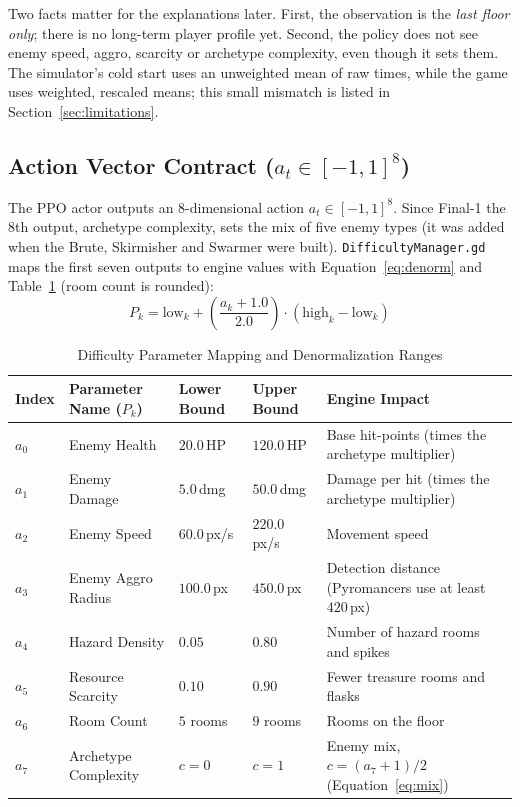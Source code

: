 Two facts matter for the explanations later. First, the observation is the \emph{last floor only}; there is no long-term player profile yet. Second, the policy does not see enemy speed, aggro, scarcity or archetype complexity, even though it sets them. The simulator's cold start uses an unweighted mean of raw times, while the game uses weighted, rescaled means; this small mismatch is listed in Section~\ref{sec:limitations}.

\subsection{Action Vector Contract ($a_t \in [-1, 1]^8$)}
The PPO actor outputs an 8-dimensional action $a_t \in [-1, 1]^8$. Since Final-1 the 8th output, archetype complexity, sets the mix of five enemy types (it was added when the Brute, Skirmisher and Swarmer were built). \texttt{DifficultyManager.gd} maps the first seven outputs to engine values with Equation~\ref{eq:denorm} and Table~\ref{tab:param_ranges} (room count is rounded):
\begin{equation}
P_k = \text{low}_k + \left( \frac{a_k + 1.0}{2.0} \right) \cdot (\text{high}_k - \text{low}_k)
\label{eq:denorm}
\end{equation}

\begin{table}[!htbp]
\centering
\caption{Difficulty Parameter Mapping and Denormalization Ranges}
\label{tab:param_ranges}
\small
\begin{tabular}{p{}p{}p{}p{}p{}}
\toprule
\textbf{Index} & \textbf{Parameter Name ($P_k$)} & \textbf{Lower Bound} & \textbf{Upper Bound} & \textbf{Engine Impact} \\
\midrule
$a_0$ & Enemy Health & $20.0$\,HP & $120.0$\,HP & Base hit-points (times the archetype multiplier) \\
$a_1$ & Enemy Damage & $5.0$\,dmg & $50.0$\,dmg & Damage per hit (times the archetype multiplier) \\
$a_2$ & Enemy Speed & $60.0$\,px/s & $220.0$\,px/s & Movement speed \\
$a_3$ & Enemy Aggro Radius & $100.0$\,px & $450.0$\,px & Detection distance (Pyromancers use at least $420$\,px) \\
$a_4$ & Hazard Density & $0.05$ & $0.80$ & Number of hazard rooms and spikes \\
$a_5$ & Resource Scarcity & $0.10$ & $0.90$ & Fewer treasure rooms and flasks \\
$a_6$ & Room Count & $5$ rooms & $9$ rooms & Rooms on the floor \\
$a_7$ & Archetype Complexity & $c = 0$ & $c = 1$ & Enemy mix, $c = (a_7+1)/2$ (Equation~\ref{eq:mix}) \\
\bottomrule
\end{tabular}
\end{table}

